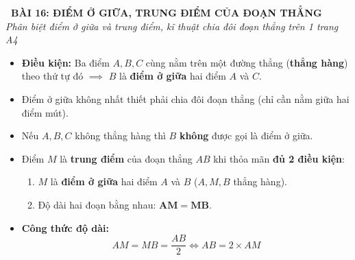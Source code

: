 \documentclass[12pt,a4paper]{article}
\begin{document}
\begin{tcolorbox}[
  enhanced,
  colback=teal!8!white,
  colframe=teal!70!black,
  arc=3mm, boxrule=1.2pt,
  left=3mm, right=3mm, top=2mm, bottom=2mm,
  halign=center
]
  {\LARGE\bfseries\color{teal!90!black}\faBookmark\ BÀI 16: ĐIỂM Ở GIỮA, TRUNG ĐIỂM CỦA ĐOẠN THẲNG}\\[1mm]
  {\itshape\footnotesize\color{black!75} Phân biệt điểm ở giữa và trung điểm, kĩ thuật chia đôi đoạn thẳng trên 1 trang A4}
\end{tcolorbox}

\vspace{-2mm}

\noindent
\begin{minipage}[t]{0.49\textwidth}\vspace{0pt}
\begin{tcolorbox}[
  enhanced,
  colback=blue!4!white,
  colframe=blue!75!black,
  arc=2mm, boxrule=0.8pt,
  left=2mm, right=2mm, top=1.8mm, bottom=1.8mm,
  title={\footnotesize\bfseries\color{white}\faTags\ 1. Điểm ở giữa}
]
{\footnotesize
\begin{itemize}\setlength{\itemsep}{1pt}\setlength{\leftskip}{-2.5mm}
  \item \textbf{Điều kiện:} Ba điểm $A, B, C$ cùng nằm trên một đường thẳng (\textbf{thẳng hàng}) theo thứ tự đó $\implies$ $B$ là \textbf{điểm ở giữa} hai điểm $A$ và $C$.
  \item Điểm ở giữa không nhất thiết phải chia đôi đoạn thẳng (chỉ cần nằm giữa hai điểm mút).
  \item Nếu $A, B, C$ không thẳng hàng thì $B$ \textbf{không} được gọi là điểm ở giữa.
\end{itemize}
}
\end{tcolorbox}
\end{minipage}
\hfill
\begin{minipage}[t]{0.49\textwidth}\vspace{0pt}
\begin{tcolorbox}[
  enhanced,
  colback=teal!4!white,
  colframe=teal!75!black,
  arc=2mm, boxrule=0.8pt,
  left=2mm, right=2mm, top=1.8mm, bottom=1.8mm,
  title={\footnotesize\bfseries\color{white}\faBalanceScale\ 2. Trung điểm của đoạn thẳng}
]
{\footnotesize
\begin{itemize}\setlength{\itemsep}{1pt}\setlength{\leftskip}{-2.5mm}
  \item Điểm $M$ là \textbf{trung điểm} của đoạn thẳng $AB$ khi thỏa mãn \textbf{đủ 2 điều kiện}:
  \begin{enumerate}\setlength{\itemsep}{0.5pt}\setlength{\leftskip}{-2.5mm}
    \item $M$ là \textbf{điểm ở giữa} hai điểm $A$ và $B$ ($A, M, B$ thẳng hàng).
    \item Độ dài hai đoạn bằng nhau: $\mathbf{AM = MB}$.
  \end{enumerate}
  \item \textbf{Công thức độ dài:}
  $$AM = MB = \dfrac{AB}{2} \iff AB = 2 \times AM$$
\end{itemize}
}
\end{tcolorbox}
\end{minipage}
\end{document}
